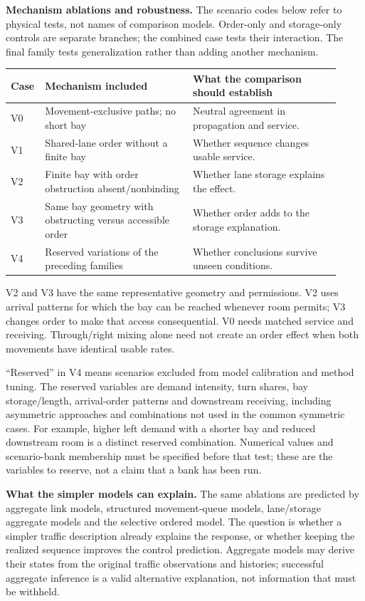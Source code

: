 \documentclass[10pt,a4paper]{article}
\begin{document}
\textbf{Mechanism ablations and robustness.} The scenario codes below
refer to physical tests, not names of comparison models. Order-only and
storage-only controls are separate branches; the combined case tests
their interaction. The final family tests generalization rather than
adding another mechanism.
\begin{center}
\setlength{\tabcolsep}{4pt}
\begin{tabular}{@{}>{\raggedright\arraybackslash}p{0.06\linewidth}>{\raggedright\arraybackslash}p{0.43\linewidth}>{\raggedright\arraybackslash}p{0.43\linewidth}@{}}
\toprule
Case & Mechanism included & What the comparison should establish\\
\midrule
V0 & Movement-exclusive paths; no short bay & Neutral agreement in propagation and service.\\
V1 & Shared-lane order without a finite bay & Whether sequence changes usable service.\\
V2 & Finite bay with order obstruction absent/nonbinding & Whether lane storage explains the effect.\\
V3 & Same bay geometry with obstructing versus accessible order & Whether order adds to the storage explanation.\\
V4 & Reserved variations of the preceding families & Whether conclusions survive unseen conditions.\\
\bottomrule
\end{tabular}
\end{center}
V2 and V3 have the same representative geometry and permissions.
V2 uses arrival patterns for which the bay can be reached whenever room
permits; V3 changes order to make that access consequential. V0 needs
matched service and receiving. Through/right mixing alone need not create
an order effect when both movements have identical usable rates.

``Reserved'' in V4 means scenarios excluded from model calibration and
method tuning. The reserved variables are demand intensity, turn shares,
bay storage/length, arrival-order patterns and downstream receiving,
including asymmetric approaches and combinations not used in the common
symmetric cases. For example, higher left demand with a shorter bay and
reduced downstream room is a distinct reserved combination. Numerical
values and scenario-bank membership must be specified before that test;
these are the variables to reserve, not a claim that a bank has been run.

\textbf{What the simpler models can explain.} The same ablations are
predicted by aggregate link models, structured movement-queue models,
lane/storage aggregate models and the selective ordered model. The
question is whether a simpler traffic description already explains the
response, or whether keeping the realized sequence improves the control
prediction. Aggregate models may derive their states from the original
traffic observations and histories; successful aggregate inference is a
valid alternative explanation, not information that must be withheld.
\end{document}
